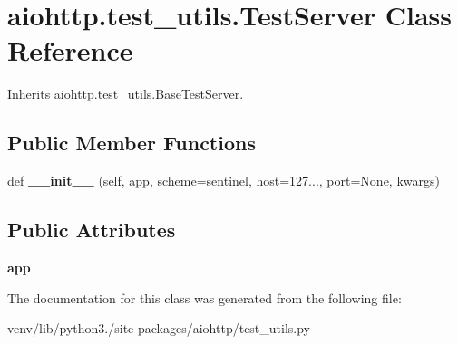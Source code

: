 \hypertarget{classaiohttp_1_1test__utils_1_1_test_server}{}\section{aiohttp.\+test\+\_\+utils.\+Test\+Server Class Reference}
\label{classaiohttp_1_1test__utils_1_1_test_server}


Inherits \hyperlink{classaiohttp_1_1test__utils_1_1_base_test_server}{aiohttp.\+test\+\_\+utils.\+Base\+Test\+Server}.

\subsection*{Public Member Functions}
\begin{DoxyCompactItemize}
\item 
\mbox{\label{classaiohttp_1_1test__utils_1_1_test_server_a3544cbe7bbc117e2e02e53a852766863}} 
def {\bfseries \+\_\+\+\_\+init\+\_\+\+\_\+} (self, app, scheme=sentinel, host=\textquotesingle{}127...\textquotesingle{}, port=None, kwargs)
\end{DoxyCompactItemize}
\subsection*{Public Attributes}
\begin{DoxyCompactItemize}
\item 
\mbox{\label{classaiohttp_1_1test__utils_1_1_test_server_a8f036b0e8b4d3bf728144748e5972d1b}} 
{\bfseries app}
\end{DoxyCompactItemize}


The documentation for this class was generated from the following file\+:\begin{DoxyCompactItemize}
\item 
venv/lib/python3./site-\/packages/aiohttp/test\+\_\+utils.\+py\end{DoxyCompactItemize}
